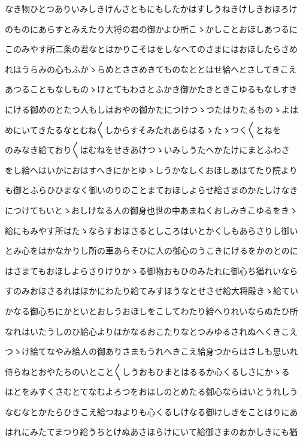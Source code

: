 \documentclass[a4paper,11pt,landscape]{ltjtarticle}
\begin{document}
なき物ひとつありいみしきけんさともにもしたかはすしうねきけしきおほろけ
\par\medskip
のものにあらすとみえたり大将の君の御かよひ所こゝかしことおほしあつるに
\par\medskip
このみやす所二条の君なとはかりこそはをしなへてのさまにはおほしたらさめ
\par\medskip
れはうらみの心もふかゝらめとささめきてものなととはせ給へとさしてきこえ
\par\medskip
あつることもなしものゝけとてもわさとふかき御かたきときこゆるもなしすき
\par\medskip
にける御めのとたつ人もしはおやの御かたにつけつゝつたはりたるものゝよは
\par\medskip
めにいてきたるなとむね〱しからすそみたれあらはるゝたゝつく〱とねを
\par\medskip
のみなき給ており〱はむねをせきあけつゝいみしうたへかたけにまとふわさ
\par\medskip
をし給へはいかにおはすへきにかとゆゝしうかなしくおほしあはてたり院より
\par\medskip
も御とふらひひまなく御いのりのことまておほしよらせ給さまのかたしけなき
\par\medskip
につけてもいとゝおしけなる人の御身也世の中あまねくおしみきこゆるをきゝ
\par\medskip
給にもみやす所はたゝならすおほさるとしころはいとかくしもあらさりし御い
\par\medskip
とみ心をはかなかりし所の車あらそひに人の御心のうこきにけるをかのとのに
\par\medskip
はさまてもおほしよらさりけりかゝる御物おもひのみたれに御心ち猶れいなら
\par\medskip
すのみおほさるれはほかにわたり給てみすほうなとせさせ給大将殿きゝ給てい
\par\medskip
かなる御心ちにかといとおしうおほしをこしてわたり給へりれいならぬたひ所
\par\medskip
なれはいたうしのひ給心よりほかなるおこたりなとつみゆるされぬへくきこえ
\par\medskip
つゝけ給てなやみ給人の御ありさまもうれへきこえ給身つからはさしも思いれ
\par\medskip
侍らねとおやたちのいとこと〱しうおもひまとはるるか心くるしさにかゝる
\par\medskip
ほとをみすくさむとてなむよろつをおほしのとめたる御心ならはいとうれしう
\par\medskip
なむなとかたらひきこえ給つねよりも心くるしけなる御けしきをことはりにあ
\par\medskip
はれにみたてまつり給うちとけぬあさほらけにいて給御さまのおかしきにも猶
\end{document}
